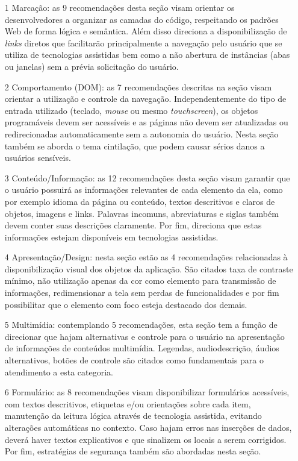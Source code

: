 \begin{itemize}
	\item[1] Marcação: as 9 recomendações desta seção visam orientar os desenvolvedores a organizar as camadas do código, respeitando os padrões Web de forma lógica e semântica. Além disso direciona a disponibilização de \textit{links} diretos que facilitarão principalmente a navegação pelo usuário que se utiliza de tecnologias assistidas bem como a não abertura de instâncias (abas ou janelas) sem a prévia solicitação do usuário.
	
	\item[2] Comportamento (DOM): as 7 recomendações descritas na seção visam orientar a utilização e controle da navegação. Independentemente do tipo de entrada utilizado (teclado, \textit{mouse} ou mesmo \textit{touchscreen}), os objetos programáveis devem ser acessíveis e as páginas não devem ser atualizadas ou redirecionadas automaticamente sem a autonomia do usuário. Nesta seção também se aborda o tema cintilação, que podem causar sérios danos a usuários sensíveis.
	
	\item[3] Conteúdo/Informação: as 12 recomendações desta seção visam garantir que o usuário possuirá as informações relevantes de cada elemento da ela, como por exemplo idioma da página ou conteúdo, textos descritivos e claros de objetos, imagens e links. Palavras incomuns, abreviaturas e siglas também devem conter suas descrições claramente. Por fim, direciona que estas informações estejam disponíveis em tecnologias assistidas.

	\item[4] Apresentação/Design: nesta seção estão as 4 recomendações relacionadas à disponibilização visual dos objetos da aplicação. São citados taxa de contraste mínimo, não utilização apenas da cor como elemento para transmissão de informações, redimensionar a tela sem perdas de funcionalidades e por fim possibilitar que o elemento com foco esteja destacado dos demais.
	
	\item[5] Multimídia: contemplando 5 recomendações, esta seção tem a função de direcionar que hajam alternativas e controle para o usuário na apresentação de informações de conteúdos multimídia. Legendas, audiodescrição, áudios alternativos, botões de controle são citados como fundamentais para o atendimento a esta categoria.	
	
	\item[6] Formulário: as 8 recomendações visam disponibilizar formulários acessíveis, com textos descritivos, etiquetas e/ou orientações sobre cada item, manutenção da leitura lógica através de tecnologia assistida, evitando alterações automáticas no contexto. Caso hajam erros nas inserções de dados, deverá haver textos explicativos e que sinalizem os locais a serem corrigidos. Por fim, estratégias de segurança também são abordadas nesta seção.
	
\end{itemize}

